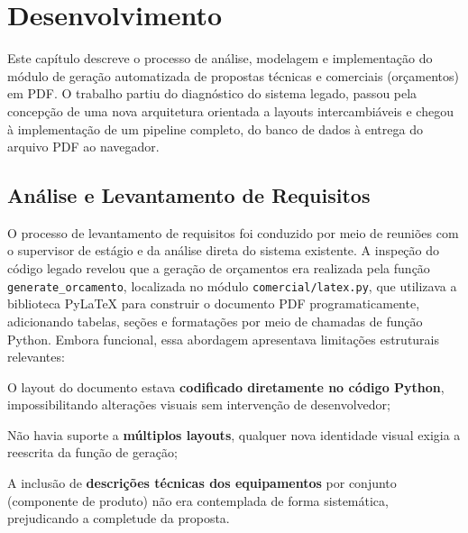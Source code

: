 
\chapter{Desenvolvimento}
\label{cap:desenvolvimento}

Este capítulo descreve o processo de análise, modelagem e implementação do módulo de geração
automatizada de propostas técnicas e comerciais (orçamentos) em PDF. O trabalho partiu do diagnóstico
do sistema legado, passou pela concepção de uma nova arquitetura orientada a layouts intercambiáveis e
chegou à implementação de um pipeline completo, do banco de dados à entrega do arquivo PDF ao
navegador.

\section{Análise e Levantamento de Requisitos}
\label{sec:requisitos}

O processo de levantamento de requisitos foi conduzido por meio de reuniões com o supervisor de estágio
e da análise direta do sistema existente. A inspeção do código legado revelou que a geração de
orçamentos era realizada pela função \texttt{generate\_orcamento}, localizada no módulo
\texttt{comercial/latex.py}, que utilizava a biblioteca PyLaTeX para construir o documento PDF
programaticamente, adicionando tabelas, seções e formatações por meio de chamadas de função Python.
Embora funcional, essa abordagem apresentava limitações estruturais relevantes:

\begin{alineas}
    \item O layout do documento estava \textbf{codificado diretamente no código Python}, impossibilitando
    alterações visuais sem intervenção de desenvolvedor;
    \item Não havia suporte a \textbf{múltiplos layouts}, qualquer nova identidade visual exigia a
    reescrita da função de geração;
    \item A inclusão de \textbf{descrições técnicas dos equipamentos} por conjunto (componente de
    produto) não era contemplada de forma sistemática, prejudicando a completude da proposta.
\end{alineas}

